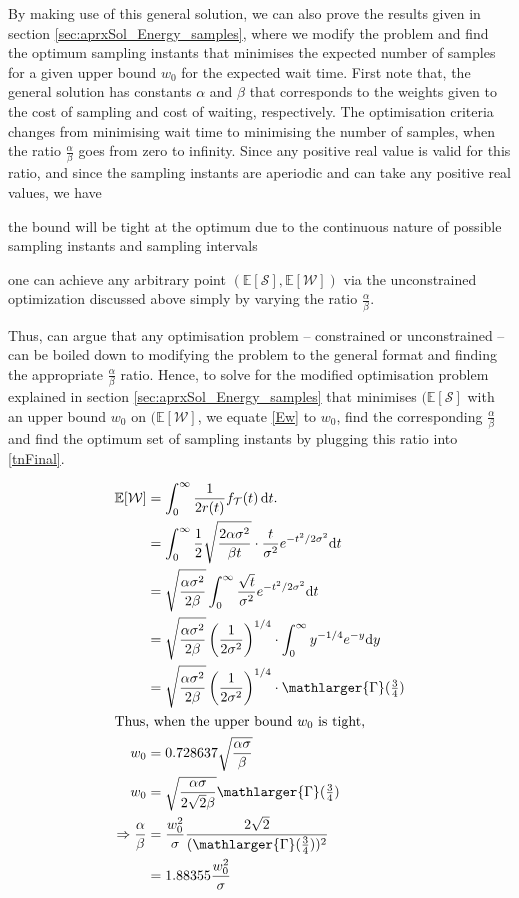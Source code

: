 By making use of this general solution, we can also prove the results given in section \ref{sec:aprxSol_Energy_samples}, where we modify the problem and find the optimum sampling instants that minimises the expected number of samples for a given upper bound $w_0$ for the expected wait time. 
First note that, the general solution has constants $\alpha$ and $\beta$ that corresponds to the weights given to the cost of sampling and cost of waiting, respectively. The optimisation criteria changes from minimising wait time to minimising the number of samples, when the ratio $\frac{\alpha}{\beta}$ goes from zero to infinity. Since any positive real value is valid for this ratio, and since the sampling instants are aperiodic and can take any positive real values, we have
\begin{inlineenum}
    \item the bound will be tight at the optimum due to the continuous nature of possible sampling instants and sampling intervals
    \item one can achieve any arbitrary point $(\mathbb{E}[\mathcal{S}],\mathbb{E}[\mathcal{W}])$ via the unconstrained optimization discussed above simply by varying the ratio $\frac{\alpha}{\beta}$.
\end{inlineenum}
Thus, can argue that any optimisation problem -- constrained or unconstrained -- can be boiled down to modifying the problem to the general format and finding the appropriate $\frac{\alpha}{\beta}$ ratio. Hence, to solve for the modified optimisation problem explained in section \ref{sec:aprxSol_Energy_samples} that minimises $(\mathbb{E}[\mathcal{S}]$ with an upper bound $w_0$ on $(\mathbb{E}[\mathcal{W}]$, we equate \cref{Ew} to $w_0$, find the corresponding $\frac{\alpha}{\beta}$ and find the optimum set of sampling instants by plugging this ratio into \cref{tnFinal}. 

\begin{alignat*}{1}
\mathbb{E}[\mathcal{W}]&=\int_{0}^{\infty}\dfrac{1}{2r(t)}f_\mathcal{T}(t)\,\mathrm{d}t.\nonumber\\
&=\int_{0}^{\infty}\frac{1}{2}\sqrt{\frac{2\alpha\sigma^2}{\beta t}}\cdot \frac{t}{\sigma^2}e^{-{t^2}/{2\sigma^2}}\mathrm{d}t\\
&=\sqrt{\frac{\alpha\sigma^2}{2\beta}}\int_{0}^{\infty}\frac{\sqrt{t}}{\sigma^2}e^{-{t^2}/{2\sigma^2}}\mathrm{d}t\\
&=\sqrt{\frac{\alpha\sigma^2}{2\beta}}\left({\frac{1}{{2}\sigma^2}}\right)^{1/4}\cdot\int_{0}^{\infty}y^{-1/4}e^{-y}\mathrm{d}y\\
&=\sqrt{\frac{\alpha\sigma^2}{2\beta}}\left({\frac{1}{{2}\sigma^2}}\right)^{1/4}\cdot\mathlarger{\Gamma}(\tfrac{3}{4})\\
\intertext{Thus, when the upper bound $w_0$ is tight,}
w_0&=0.728637\sqrt{\frac{\alpha\sigma}{\beta}}\\
w_0&=\sqrt{\frac{\alpha\sigma}{2\sqrt{2}\beta}}\mathlarger{\Gamma}(\tfrac{3}{4})\\
\Rightarrow\frac{\alpha}{\beta}&=\frac{w_0^2}{\sigma}\frac{2\sqrt{2}}{(\mathlarger{\Gamma}(\tfrac{3}{4}))^2}\\&=1.88355\frac{w_0^2}{\sigma}
\end{alignat*}
